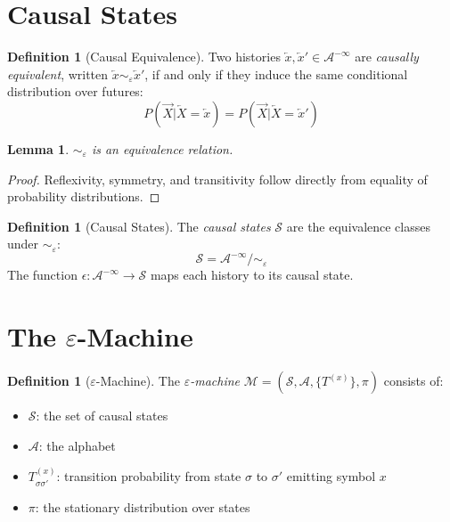 \documentclass[11pt,twocolumn]{article}
\theoremstyle{plain}
\newtheorem{lemma}[theorem]{Lemma}
\theoremstyle{definition}
\newtheorem{definition}[theorem]{Definition}
\theoremstyle{remark}
\newcommand{\eps}{\varepsilon}
\newcommand{\calS}{\mathcal{S}}
\newcommand{\calA}{\mathcal{A}}
\newcommand{\calM}{\mathcal{M}}
\newcommand{\Past}{\overleftarrow{X}}
\newcommand{\Future}{\overrightarrow{X}}
\newcommand{\past}{\overleftarrow{x}}
\begin{document}
\section{Causal States}
\label{sec:causal-states}

\begin{definition}[Causal Equivalence]
\label{def:causal-equiv}
Two histories $\past, \past' \in \calA^{-\infty}$ are \emph{causally equivalent}, written $\past \sim_\eps \past'$, if and only if they induce the same conditional distribution over futures:
\begin{equation}
    P(\Future | \Past = \past) = P(\Future | \Past = \past')
\end{equation}
\end{definition}

\begin{lemma}
$\sim_\eps$ is an equivalence relation.
\end{lemma}
\begin{proof}
Reflexivity, symmetry, and transitivity follow directly from equality of probability distributions.
\end{proof}

\begin{definition}[Causal States]
\label{def:causal-states}
The \emph{causal states} $\calS$ are the equivalence classes under $\sim_\eps$:
\begin{equation}
    \calS = \calA^{-\infty} / \sim_\eps
\end{equation}
The function $\epsilon: \calA^{-\infty} \to \calS$ maps each history to its causal state.
\end{definition}

\section{The $\eps$-Machine}
\label{sec:epsilon-machine}

\begin{definition}[$\eps$-Machine]
The \emph{$\eps$-machine} $\calM = (\calS, \calA, \{T^{(x)}\}, \pi)$ consists of:
\begin{itemize}[nosep]
    \item $\calS$: the set of causal states
    \item $\calA$: the alphabet
    \item $T^{(x)}_{\sigma\sigma'}$: transition probability from state $\sigma$ to $\sigma'$ emitting symbol $x$
    \item $\pi$: the stationary distribution over states
\end{itemize}
\end{definition}
\end{document}
